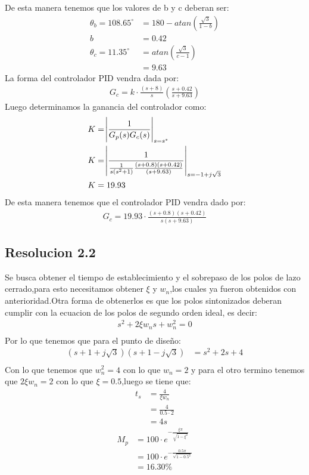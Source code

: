\documentclass[
  11pt,
  letterpaper,
   addpoints,
   answers
  ]{exam}
\begin{document}
\begin{questions}
\begin{solution}
De esta manera tenemos que los valores de b y c deberan ser:
\begin{align}
    \theta_{b}=108.65^{\circ}&= 180 - atan(\frac{\sqrt{3}}{1-b})\\
    b&= 0.42\\
    \theta_{c}= 11.35^{\circ} &= atan(\frac{\sqrt{3}}{c-1})\\
    &=9.63
\end{align}
La forma del controlador PID vendra dada por:
\begin{align}
    G_{c} = k\cdot \frac{(s+8)}{s}\left(\frac{s+0.42}{s+9.63}\right)
\end{align}
Luego determinamos la ganancia del controlador como:
\begin{align}
    K &= \abs{\frac{1}{G_{p}(s)G_{c}(s)}}_{s=s^{*}}\\
    K &= \abs{\frac{1}{\frac{1}{s(s^{2}+1)}\frac{(s+0.8)(s+0.42)}{(s+9.63)}}}_{s=-1+j\sqrt{3}}\\
    K &= 19.93
\end{align}
De esta manera tenemos que el controlador PID vendra dado por:
\begin{align}
    G_{c} = 19.93\cdot \frac{(s+0.8)(s+0.42)}{s(s+9.63)}
\end{align}
\subsection*{Resolucion 2.2}
Se busca obtener el tiempo de establecimiento y el sobrepaso de los polos de lazo cerrado,para esto necesitamos obtener $\xi$ y $w_{n}$,los cuales ya fueron obtenidos con anterioridad.Otra forma de obtenerlos es que los polos sintonizados deberan cumplir con la ecuacion de los polos de segundo orden ideal, es decir:
\begin{align}
    s^{2}+ 2\xi w_{n}s + w_{n}^{2} = 0\\
\end{align}
Por lo que tenemos que para el punto de diseño:
\begin{align}
    (s+1+j\sqrt{3})(s+1-j\sqrt{3}) &= s^{2} + 2s + 4\\
\end{align}
Con lo que tenemos que $w_{n}^{2}=4$ con lo que $w_{n}=2$ y para el otro termino tenemos que $2\xi w_{n} = 2$ con lo que $\xi = 0.5$,luego se tiene que:
\begin{align}
    t_{s} &= \frac{4}{\xi w_{n}}\\
          &= \frac{4}{0.5\cdot 2}\\
          &= 4 s
\end{align}
\begin{align}
    M_{p} &= 100 \cdot e^{-\frac{\xi \pi}{\sqrt{1-\xi^{2}}}}\\
          &= 100 \cdot e^{-\frac{0.5 \pi}{\sqrt{1-0.5^{2}}} }\\
          &= 16.30 \%
\end{align}

\end{solution}
\end{questions}
\end{document}
